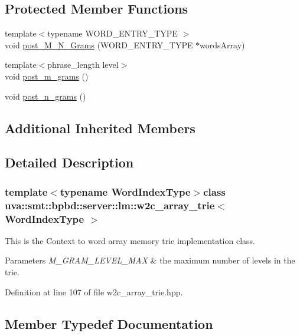 \subsection*{Protected Member Functions}
\begin{DoxyCompactItemize}
\item 
{\footnotesize template$<$typename W\+O\+R\+D\+\_\+\+E\+N\+T\+R\+Y\+\_\+\+T\+Y\+P\+E $>$ }\\void \hyperlink{classuva_1_1smt_1_1bpbd_1_1server_1_1lm_1_1w2c__array__trie_a1266cdb31bc75f50becaba93b7b56a1e}{post\+\_\+\+M\+\_\+\+N\+\_\+\+Grams} (W\+O\+R\+D\+\_\+\+E\+N\+T\+R\+Y\+\_\+\+T\+Y\+P\+E $\ast$words\+Array)
\item 
{\footnotesize template$<$phrase\+\_\+length level$>$ }\\void \hyperlink{classuva_1_1smt_1_1bpbd_1_1server_1_1lm_1_1w2c__array__trie_af7c4dbaabf12db56200962fdcbf011b8}{post\+\_\+m\+\_\+grams} ()
\item 
void \hyperlink{classuva_1_1smt_1_1bpbd_1_1server_1_1lm_1_1w2c__array__trie_a592e4b128b19de6025afdde3cbcee4ed}{post\+\_\+n\+\_\+grams} ()
\end{DoxyCompactItemize}
\subsection*{Additional Inherited Members}


\subsection{Detailed Description}
\subsubsection*{template$<$typename Word\+Index\+Type$>$class uva\+::smt\+::bpbd\+::server\+::lm\+::w2c\+\_\+array\+\_\+trie$<$ Word\+Index\+Type $>$}

This is the Context to word array memory trie implementation class.


\begin{DoxyParams}{Parameters}
{\em M\+\_\+\+G\+R\+A\+M\+\_\+\+L\+E\+V\+E\+L\+\_\+\+M\+A\+X} & the maximum number of levels in the trie. \\
\hline
\end{DoxyParams}


Definition at line 107 of file w2c\+\_\+array\+\_\+trie.\+hpp.



\subsection{Member Typedef Documentation}
\hypertarget{classuva_1_1smt_1_1bpbd_1_1server_1_1lm_1_1w2c__array__trie_aa34a328bdf938c35815589863e49eb6e}{}

